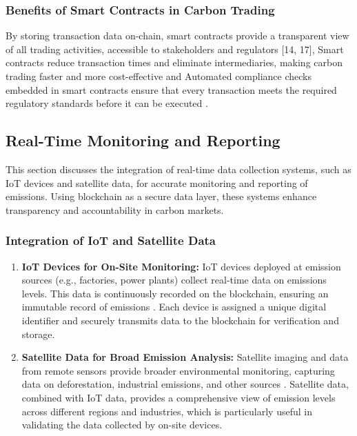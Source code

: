 \documentclass[preprint,12pt]{elsarticle}
\begin{document}
\subsubsection{Benefits of Smart Contracts in Carbon Trading}
By storing transaction data on-chain, smart contracts provide a transparent view of all trading activities, accessible to stakeholders and regulators [14, 17], Smart contracts reduce transaction times and eliminate intermediaries, making carbon trading faster and more cost-effective \citep{parikh2022smart} and Automated compliance checks embedded in smart contracts ensure that every transaction meets the required regulatory standards before it can be executed \citep{buterin2014next}.
\subsection{Real-Time Monitoring and Reporting}
This section discusses the integration of real-time data collection systems, such as IoT devices and satellite data, for accurate monitoring and reporting of emissions. Using blockchain as a secure data layer, these systems enhance transparency and accountability in carbon markets.
\subsubsection{Integration of IoT and Satellite Data}
\begin{enumerate}
    \item \textbf{IoT Devices for On-Site Monitoring:}
IoT devices deployed at emission sources (e.g., factories, power plants) collect real-time data on emissions levels. This data is continuously recorded on the blockchain, ensuring an immutable record of emissions \citep{parikh2020smart}. Each device is assigned a unique digital identifier and securely transmits data to the blockchain for verification and storage.
\item \textbf{Satellite Data for Broad Emission Analysis:}
Satellite imaging and data from remote sensors provide broader environmental monitoring, capturing data on deforestation, industrial emissions, and other sources \citep{adams2018blockchain}. Satellite data, combined with IoT data, provides a comprehensive view of emission levels across different regions and industries, which is particularly useful in validating the data collected by on-site devices.
\end{enumerate}
\end{document}
